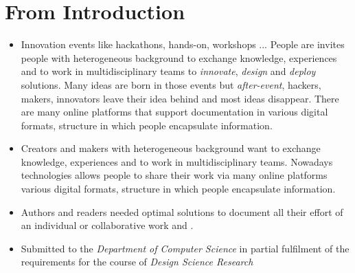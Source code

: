 \section{From Introduction}


\begin{itemize}


	\item  Innovation events like hackathons, hands-on, workshops ...  People are invites people with heterogeneous background to exchange knowledge, experiences and to work in multidisciplinary teams to \textit{innovate}, \textit{design} and \textit{deploy} solutions. Many ideas are born in those events but \textit{after-event}, hackers, makers, innovators leave their idea behind and most ideas disappear. There are many online platforms that support documentation in various digital formats, structure in which people encapsulate information.

	\item  Creators and makers with heterogeneous background want to exchange knowledge, experiences and to work in multidisciplinary teams. Nowadays technologies allows people to share their work via many online platforms various digital formats, structure in which people encapsulate information.


	\item  Authors and readers needed optimal solutions to document all their effort of an individual or collaborative work and .
	
	\item {Submitted to the \textit{Department of Computer Science} in partial fulfilment of the requirements for the course of  \textit{Design Science Research}}

\end{itemize}
